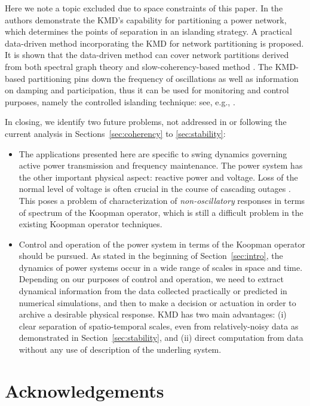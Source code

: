 \documentclass[a4paper,10pt]{article}
\begin{document}
%
Here we note a topic excluded due to space constraints of this paper.  
In \cite{Raak_IEEETPWRS2015,Raak_IFACCPES15} the authors demonstrate the KMD's capability for partitioning a power network, which determines the points of separation in an islanding strategy.  
A practical data-driven method incorporating the KMD for network partitioning is proposed.  
It is shown that the data-driven method can cover network partitions derived from both spectral graph theory \cite{Fiedler75} and slow-coherency-based method \cite{Yusof_IEEETPS8}.  
The KMD-based partitioning pins down the frequency of oscillations as well as information on damping and participation, thus it can be used for monitoring and control purposes, namely the controlled islanding technique: see, e.g., \cite{YouVittal2004}.

%
In closing, we identify two future problems, not addressed in or following the current analysis in Sections~\ref{sec:coherency} to \ref{sec:stability}: 
\begin{itemize}
\item The applications presented here are specific to swing dynamics governing active power transmission and frequency maintenance.  
The power system has  the other important physical aspect: reactive power and voltage.  
Loss of the normal level of voltage is often crucial in the course of cascading outages \cite{Kurita_CDC88,Sweden:2003,NorthAmerica:2003}.  
This poses a problem of characterization of \emph{non-oscillatory} responses in terms of spectrum of the Koopman operator, which is still a difficult problem in the existing Koopman operator techniques.   
%
\item Control and operation of the power system in terms of the Koopman operator should be pursued.  
As stated in the beginning of Section~\ref{sec:intro}, the dynamics of power systems occur in a wide range of scales in space and time.  
Depending on our purposes of control and operation, we need to extract dynamical information from the data collected practically or predicted in numerical simulations, and then to make a decision or actuation in order to archive a desirable physical response.  
KMD has two main advantages:  (i) clear separation of spatio-temporal scales, even from relatively-noisy data as demonstrated in Section~\ref{sec:stability}, and (ii) direct computation from data without any use of description of the underling system.
\end{itemize}


\section*{Acknowledgements}
\end{document}

